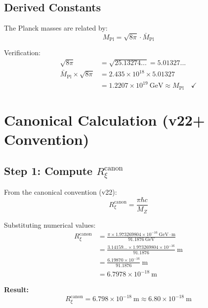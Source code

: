 \documentclass[11pt,a4paper]{article}
\newcommand{\Rxi}{R_\xi}
\newcommand{\Mpl}{M_{\mathrm{Pl}}}
\newcommand{\Mplbar}{\bar{M}_{\mathrm{Pl}}}
\newcommand{\MZ}{M_Z}
\newcommand{\hbarc}{\hbar c}
\begin{document}
\subsection{Derived Constants}

The Planck masses are related by:
\begin{equation}
\Mpl = \sqrt{8\pi} \cdot \Mplbar
\label{eq:Mpl-Mplbar-relation}
\end{equation}

Verification:
\begin{align}
\sqrt{8\pi} &= \sqrt{25.13274...} = 5.01327... \label{eq:sqrt8pi}\\
\Mplbar \times \sqrt{8\pi} &= 2.435 \times 10^{18} \times 5.01327 \nonumber\\
&= 1.2207 \times 10^{19}~\mathrm{GeV} \approx \Mpl \quad \checkmark
\label{eq:Mpl-check}
\end{align}

\section{Canonical Calculation (v22+ Convention)}

\subsection{Step 1: Compute $\Rxi^{\mathrm{canon}}$}

From the canonical convention (v22):
\begin{equation}
\Rxi^{\mathrm{canon}} = \frac{\pi \hbarc}{\MZ}
\label{eq:Rxi-canon-formula}
\end{equation}

Substituting numerical values:
\begin{align}
\Rxi^{\mathrm{canon}} &= \frac{\pi \times 1.973269804 \times 10^{-16}~\mathrm{GeV \cdot m}}{91.1876~\mathrm{GeV}}
\label{eq:Rxi-canon-step1}\\
&= \frac{3.14159... \times 1.973269804 \times 10^{-16}}{91.1876}~\mathrm{m}
\label{eq:Rxi-canon-step2}\\
&= \frac{6.19870 \times 10^{-16}}{91.1876}~\mathrm{m}
\label{eq:Rxi-canon-step3}\\
&= 6.7978 \times 10^{-18}~\mathrm{m}
\label{eq:Rxi-canon-result}
\end{align}

\textbf{Result:}
\begin{equation}
\boxed{\Rxi^{\mathrm{canon}} = 6.798 \times 10^{-18}~\mathrm{m} \approx 6.80 \times 10^{-18}~\mathrm{m}}
\label{eq:Rxi-canon-boxed}
\end{equation}
\end{document}
